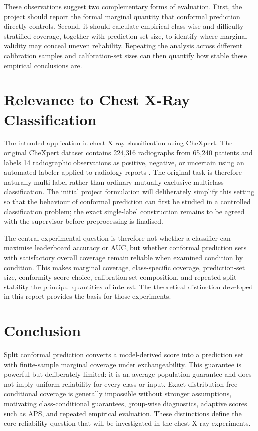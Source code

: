 \documentclass[12pt,a4paper]{article}
\begin{document}
These observations suggest two complementary forms of evaluation. First, the project should report the formal marginal quantity that conformal prediction directly controls. Second, it should calculate empirical class-wise and difficulty-stratified coverage, together with prediction-set size, to identify where marginal validity may conceal uneven reliability. Repeating the analysis across different calibration samples and calibration-set sizes can then quantify how stable these empirical conclusions are.

\section{Relevance to Chest X-Ray Classification}

The intended application is chest X-ray classification using CheXpert. The original CheXpert dataset contains 224,316 radiographs from 65,240 patients and labels 14 radiographic observations as positive, negative, or uncertain using an automated labeler applied to radiology reports \cite{irvin2019chexpert}. The original task is therefore naturally multi-label rather than ordinary mutually exclusive multiclass classification. The initial project formulation will deliberately simplify this setting so that the behaviour of conformal prediction can first be studied in a controlled classification problem; the exact single-label construction remains to be agreed with the supervisor before preprocessing is finalised.

The central experimental question is therefore not whether a classifier can maximise leaderboard accuracy or AUC, but whether conformal prediction sets with satisfactory overall coverage remain reliable when examined condition by condition. This makes marginal coverage, class-specific coverage, prediction-set size, conformity-score choice, calibration-set composition, and repeated-split stability the principal quantities of interest. The theoretical distinction developed in this report provides the basis for those experiments.

\section{Conclusion}

Split conformal prediction converts a model-derived score into a prediction set with finite-sample marginal coverage under exchangeability. This guarantee is powerful but deliberately limited: it is an average population guarantee and does not imply uniform reliability for every class or input. Exact distribution-free conditional coverage is generally impossible without stronger assumptions, motivating class-conditional guarantees, group-wise diagnostics, adaptive scores such as APS, and repeated empirical evaluation. These distinctions define the core reliability question that will be investigated in the chest X-ray experiments.

\printbibliography
\end{document}
